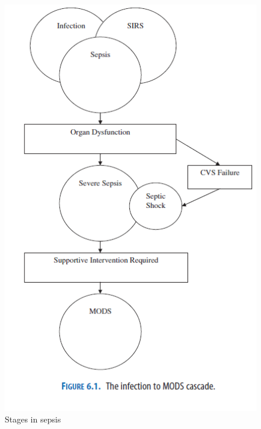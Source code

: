 \begin{figure}[H]
	\centering
	\includegraphics[width=1\textwidth]{figures/Sepsis_stages}
	\caption{Stages in sepsis}
	\label{fig:Sepsis_stages}
\end{figure} \vspace{-.3cm}
